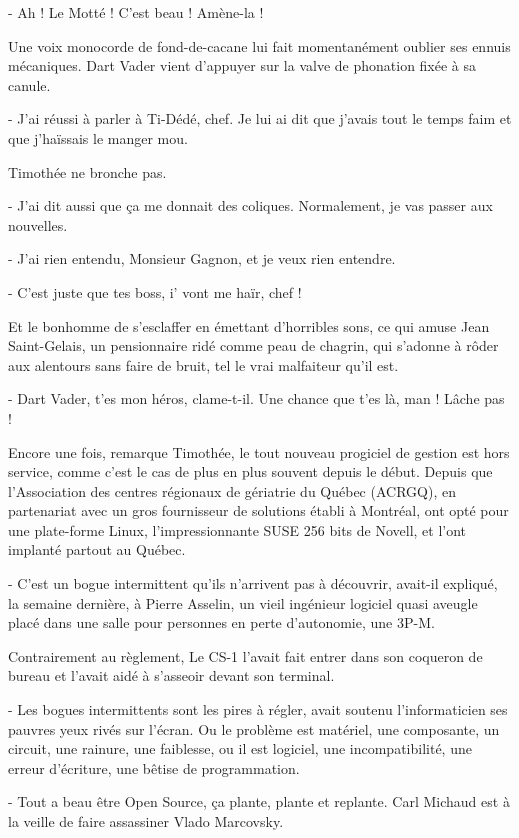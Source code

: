 - Ah ! Le Motté ! C’est beau ! Amène-la !

Une voix monocorde de fond-de-cacane lui fait momentanément oublier ses ennuis mécaniques. Dart Vader vient d’appuyer sur la valve de phonation fixée à sa canule.

- J’ai réussi à parler à Ti-Dédé, chef. Je lui ai dit que j’avais tout le temps faim et que j’haïssais le manger mou.

Timothée ne bronche pas.

- J’ai dit aussi que ça me donnait des coliques. Normalement, je vas passer aux nouvelles.

- J’ai rien entendu, Monsieur Gagnon, et je veux rien entendre.

- C’est juste que tes boss, i’ vont me haïr, chef !

Et le bonhomme de s’esclaffer en émettant d’horribles sons, ce qui amuse Jean Saint-Gelais, un pensionnaire ridé comme peau de chagrin, qui s’adonne à rôder aux alentours sans faire de bruit, tel le vrai malfaiteur qu’il est.

- Dart Vader, t’es mon héros, clame-t-il. Une chance que t’es là, man ! Lâche pas !

Encore une fois, remarque Timothée, le tout nouveau progiciel de gestion est hors service, comme c’est le cas de plus en plus souvent depuis le début. Depuis que l’Association des centres régionaux de gériatrie du Québec (ACRGQ), en partenariat avec un gros fournisseur de solutions établi à Montréal, ont opté pour une plate-forme Linux, l’impressionnante SUSE 256 bits de Novell, et l’ont implanté partout au Québec.

- C’est un bogue intermittent qu’ils n’arrivent pas à découvrir, avait-il expliqué, la semaine dernière, à Pierre Asselin, un vieil ingénieur logiciel quasi aveugle placé dans une salle pour personnes en perte d’autonomie, une 3P-M.

Contrairement au règlement, Le CS-1 l’avait fait entrer dans son coqueron de bureau et l’avait aidé à s’asseoir devant son terminal.

- Les bogues intermittents sont les pires à régler, avait soutenu l’informaticien ses pauvres yeux rivés sur l’écran. Ou le problème est matériel, une composante, un circuit, une rainure, une faiblesse, ou il est logiciel, une incompatibilité, une erreur d’écriture, une bêtise de programmation.

- Tout a beau être Open Source, ça plante, plante et replante. Carl Michaud est à la veille de faire assassiner Vlado Marcovsky.

